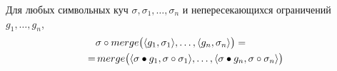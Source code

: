 
\begin{thm}\label{thm:merge-right-compose}
Для любых символьных куч $\sigma,\sigma_1,\ldots,\sigma_n$ и непересекающихся ограничений $g_1,\ldots,g_n$,
\begin{align*}
&\sigma\circ merge\big(\langle g_1, \sigma_1\rangle,\ldots,\langle g_n, \sigma_n\rangle\big)=\\
=&\,merge\big(\langle\sigma\bullet g_1, \sigma\circ\sigma_1\rangle,\ldots,\langle\sigma\bullet g_n, \sigma\circ\sigma_n\rangle\big)
\end{align*}
\end{thm}

